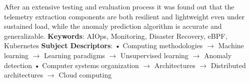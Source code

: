 After an extensive testing and evaluation process it was found out that the telemetry extraction components are both resilient and lightweight even under sustained load, while the anomaly prediction algorithm is accurate and generalizable. 
\newline
\newline
\textbf{Keywords}:
AIOps, Monitoring, Disaster Recovery, eBPF, Kubernetes
\newline
\textbf{Subject Descriptors}:
• Computing methodologies $\rightarrow$ Machine learning $\rightarrow$ Learning paradigms $\rightarrow$ Unsupervised learning $\rightarrow$ Anomaly detection • Computer systems organization $\rightarrow$ Architectures $\rightarrow$ Distributed architectures $\rightarrow$ Cloud computing